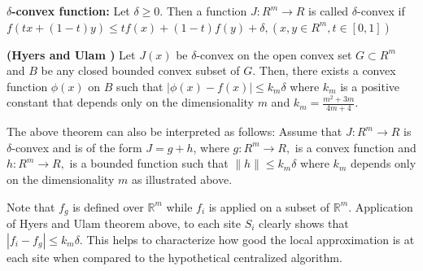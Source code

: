 \begin{defn}
\label{defn:2}
\textbf{$\delta$-convex function: } Let $\delta \ge 0.$ Then a function $J: R^m \rightarrow R$ is called $\delta$-convex if $f(tx + (1-t)y) \le tf(x) + (1-t)f(y) + \delta, (x , y \in R^m, t \in [0,1])$
\end{defn}

\begin{thm}
\textbf{(Hyers and Ulam \cite{Hyers_52})} Let $J(x)$ be $\delta$-convex on the open convex set $G \subset R^m$ and $B$ be any closed bounded convex subset of $G$. Then, there exists a convex function $\phi(x)$ on $B$ such that $|\phi(x) - f(x)| \le k_m \delta$ where $k_m$ is a positive constant that depends only on the dimensionality $m$ and $k_m = \frac{m^2+3 m}{4m + 4}$.
\end{thm}
\noindent The above theorem can also be interpreted as follows: Assume that $J: R^m \rightarrow R$ is $\delta$-convex and is of the form $J=g+h$, where $g: R^{m} \rightarrow R, $ is a convex function and $h: R^{m} \rightarrow R,$ is a bounded function such that $\parallel h \parallel \le k_m \delta$ where $k_m$ depends only on the dimensionality $m$ as illustrated above.

Note that $f_g$ is defined over $\mathbb{R}^m$ while $f_i$ is applied on a subset of $\mathbb{R}^m$. Application of Hyers and Ulam theorem above, to each site $S_i$ clearly shows that $|f_i - f_g| \le k_m \delta$. This helps to characterize how good the local approximation is at each site when compared to the hypothetical centralized algorithm. 


